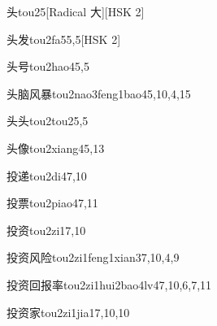 \begin{entry}{头}{tou2}{5}[Radical 大][HSK 2]
\end{entry}

\begin{entry}{头发}{tou2fa5}{5,5}[HSK 2]
\end{entry}

\begin{entry}{头号}{tou2hao4}{5,5}
\end{entry}

\begin{entry}{头脑风暴}{tou2nao3feng1bao4}{5,10,4,15}
\end{entry}

\begin{entry}{头头}{tou2tou2}{5,5}
\end{entry}

\begin{entry}{头像}{tou2xiang4}{5,13}
\end{entry}

\begin{entry}{投递}{tou2di4}{7,10}
\end{entry}

\begin{entry}{投票}{tou2piao4}{7,11}
\end{entry}

\begin{entry}{投资}{tou2zi1}{7,10}
\end{entry}

\begin{entry}{投资风险}{tou2zi1feng1xian3}{7,10,4,9}
\end{entry}

\begin{entry}{投资回报率}{tou2zi1hui2bao4lv4}{7,10,6,7,11}
\end{entry}

\begin{entry}{投资家}{tou2zi1jia1}{7,10,10}
\end{entry}

